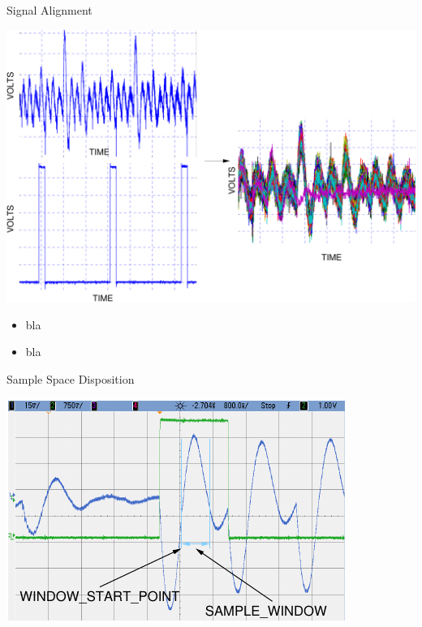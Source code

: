 \documentclass[final]{beamer}
\begin{document}
\begin{frame}[fragile]{}
\begin{columns}[t]
\begin{column}{.31\linewidth}
\begin{block}{Signal Alignment}
\begin{minipage}[t]{0.49\linewidth}
          \includegraphics[scale=0.5]{../figures/signalAlignment}
        \end{minipage}%
        \begin{minipage}[t]{0.49\linewidth}
         \begin{itemize}
           \item bla
           \item bla
         \end{itemize} 
        \end{minipage}
       \end{block}
       \begin{block}{Sample Space Disposition}
        \begin{minipage}[t]{0.49\linewidth}%
          \includegraphics[width=0.9\linewidth]{../figures/oscilloscope-sample-window}
        \end{minipage}%
        \begin{minipage}[t]{0.49\linewidth}%

\end{minipage}
\end{block}
\end{column}
\end{columns}
\end{frame}
\end{document}
